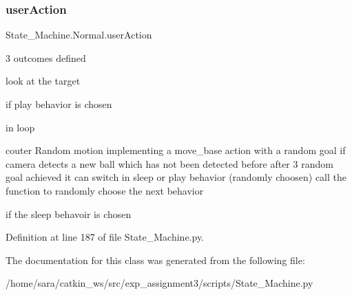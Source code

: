 \subsubsection{\texorpdfstring{user\+Action}{userAction}}
{\footnotesize\ttfamily State\+\_\+\+Machine.\+Normal.\+user\+Action}



3 outcomes defined 

look at the target

if play behavior is chosen

in loop

couter Random motion implementing a move\+\_\+base action with a random goal if camera detects a new ball which has not been detected before after 3 random goal achieved it can switch in sleep or play behavior (randomly choosen) call the function to randomly choose the next behavior

if the sleep behavoir is chosen 

Definition at line 187 of file State\+\_\+\+Machine.\+py.



The documentation for this class was generated from the following file\+:\begin{DoxyCompactItemize}
\item 
/home/sara/catkin\+\_\+ws/src/exp\+\_\+assignment3/scripts/State\+\_\+\+Machine.\+py\end{DoxyCompactItemize}
